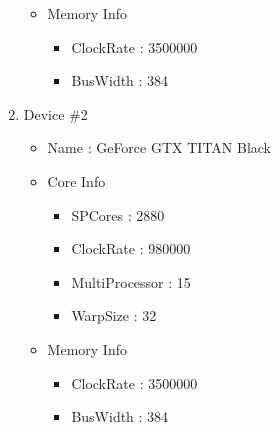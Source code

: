\documentclass{article}
\begin{document}
\begin{enumerate}
\begin{itemize}
\begin{itemize}
        \end{itemize}
        \item Memory Info
        \begin{itemize}
            \item ClockRate : 3500000
            \item BusWidth : 384
        \end{itemize}
    \end{itemize}
    \item Device \#2
    \begin{itemize}
       \item Name : GeForce GTX TITAN Black
        \item Core Info
        \begin{itemize}
            \item SPCores : 2880
            \item ClockRate : 980000
            \item MultiProcessor : 15
            \item WarpSize : 32
        \end{itemize}
        \item Memory Info
        \begin{itemize}
            \item ClockRate : 3500000
            \item BusWidth : 384
        \end{itemize}
    \end{itemize}
\end{enumerate}

\end{document}
